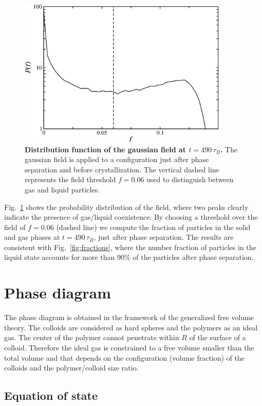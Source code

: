 \begin{figure}[!t]
 \centering
 \includegraphics[width=10cm]{./field.pdf}
 \caption{{\bf Distribution function of the gaussian field at $t=490\,\tau_B$.} The gaussian field is applied to
 a configuration just after phase separation and before crystallization. The vertical dashed line represents the
 field threshold $f=0.06$ used to distinguish between gas and liquid particles.}
 \label{fig:field}
\end{figure}

Fig.~\ref{fig:field} shows the probability distribution of the field, where two peaks clearly indicate the presence
of gas/liquid coexistence. By choosing a threshold over the field of $f=0.06$ (dashed line) we compute the fraction
of particles in the solid and gas phases at $t=490\,\tau_B$, just after phase separation. The results are consistent
with Fig.~\ref{fig:fractions}, where the number fraction of particles in the liquid state accounts for more than
$90\%$ of the particles after phase separation.

\section*{Phase diagram}

The phase diagram is obtained in the framework of the generalized free volume theory. The colloids are considered as hard spheres and the polymers as an ideal gas. The center of the polymer cannot penetrate within $R$ of the surface of a colloid. Therefore the ideal gas is constrained to a free volume smaller than the total volume and that depends on the configuration (volume fraction) of the colloids and the polymer/colloid size ratio.

\subsection*{Equation of state}

